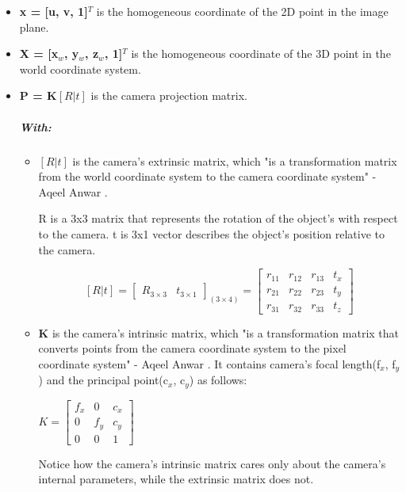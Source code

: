 \begin{itemize}
	\item \textbf{x = [u, v, 1]$^T$} is the homogeneous coordinate of the 2D point in the image plane.
	\item \textbf{X = [x$_w$, y$_w$, z$_w$, 1]$^T$} is the homogeneous coordinate of the 3D point in the world coordinate system.
	\item \textbf{P = K$[R|t]$} is the camera projection matrix.
	\subparagraph{With:}
	\begin{itemize}
		\item \textbf{$[R|t]$} is the camera's extrinsic matrix, which "is a transformation matrix from the world coordinate system to the camera coordinate system" - Aqeel Anwar \cite{Aqeel Anwar}.
		
		R is a 3x3 matrix that represents the rotation of the object’s with respect to the camera. t is 3x1 vector describes the object's position relative to the camera.
		\begin{center} 
			\[
			[R|t] = \begin{bmatrix}
				R_{3\times3} & t_{3\times1}
			\end{bmatrix}_{(3\times4)}
			=
			\begin{bmatrix}
				r_{11} & r_{12} & r_{13} & t_{x}\\
				r_{21} & r_{22} & r_{23} & t_{y}\\
				r_{31} & r_{32} & r_{33} & t_{z}
			\end{bmatrix}
			\]
		\end{center}
		
		\item \textbf{K} is the camera's intrinsic matrix, which "is a transformation matrix that converts points from the camera coordinate system to the pixel coordinate system" - Aqeel Anwar \cite{Aqeel Anwar}. It contains camera's focal length(f$_x$, f$_y$) and the principal point(c$_x$, c$_y$) as follows:
		
		\begin{center} 
			$K = \begin{bmatrix}
				f_x & 0 & c_x\\
				0 & f_y & c_y\\
				0 & 0 & 1
			\end{bmatrix}$
		\end{center}
		
		Notice how the camera's intrinsic matrix cares only about the camera's internal parameters, while the extrinsic matrix does not.
	\end{itemize}
\end{itemize}

